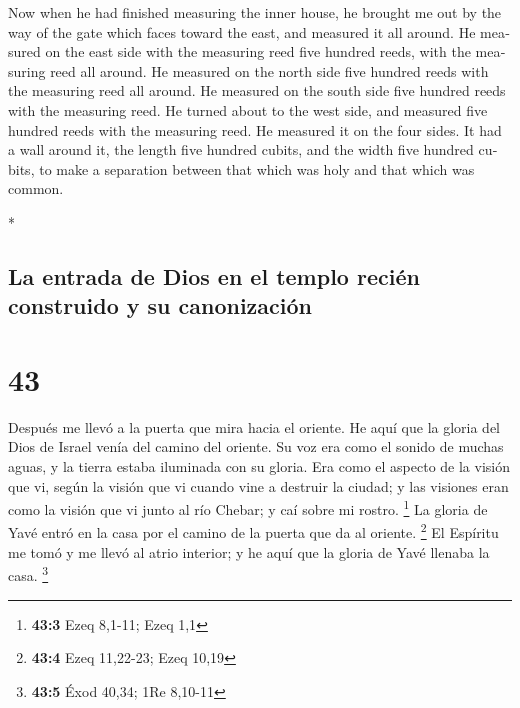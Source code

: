 \begin{paracol}{2}
\begin{otherlanguage}{english}
 Now when he had finished measuring the inner house, he
brought me out by the way of the gate which faces toward the east, and
measured it all around.  He measured on the east side
with the measuring reed five hundred reeds, with the measuring reed all
around.  He measured on the north side five hundred reeds
with the measuring reed all around.  He measured on the
south side five hundred reeds with the measuring reed. 
He turned about to the west side, and measured five hundred reeds with
the measuring reed.  He measured it on the four sides. It
had a wall around it, the length five hundred cubits, and the width five
hundred cubits, to make a separation between that which was holy and
that which was common.

\end{otherlanguage}

\switchcolumn[0]*

\hypertarget{la-entrada-de-dios-en-el-templo-reciuxe9n-construido-y-su-canonizaciuxf3n}{%
\subsection{La entrada de Dios en el templo recién construido y su
canonización}\label{la-entrada-de-dios-en-el-templo-reciuxe9n-construido-y-su-canonizaciuxf3n}}

\hypertarget{section-84}{%
\section{43}\label{section-84}}

 Después me llevó a la puerta que mira hacia el oriente.
 He aquí que la gloria del Dios de Israel venía del camino
del oriente. Su voz era como el sonido de muchas aguas, y la tierra
estaba iluminada con su gloria.  Era como el aspecto de la
visión que vi, según la visión que vi cuando vine a destruir la ciudad;
y las visiones eran como la visión que vi junto al río Chebar; y caí
sobre mi rostro. \footnote{\textbf{43:3} Ezeq 8,1-11; Ezeq 1,1}
 La gloria de Yavé entró en la casa por el camino de la
puerta que da al oriente. \footnote{\textbf{43:4} Ezeq 11,22-23; Ezeq
  10,19}  El Espíritu me tomó y me llevó al atrio
interior; y he aquí que la gloria de Yavé llenaba la casa. \footnote{\textbf{43:5}
  Éxod 40,34; 1Re 8,10-11}


\end{paracol}
